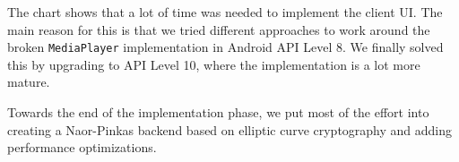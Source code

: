 \documentclass[a4paper,10pt]{scrartcl}
\begin{document}
The chart shows that a lot of time was needed to implement the client UI. The main reason
for this is that we tried different approaches to work around the broken \lstinline|MediaPlayer|
implementation in Android API Level 8. We finally solved this by upgrading to API Level 10,
where the implementation is a lot more mature.

Towards the end of the implementation phase, we put most of the effort into creating a Naor-Pinkas
backend based on elliptic curve cryptography and adding performance optimizations.
\end{document}
